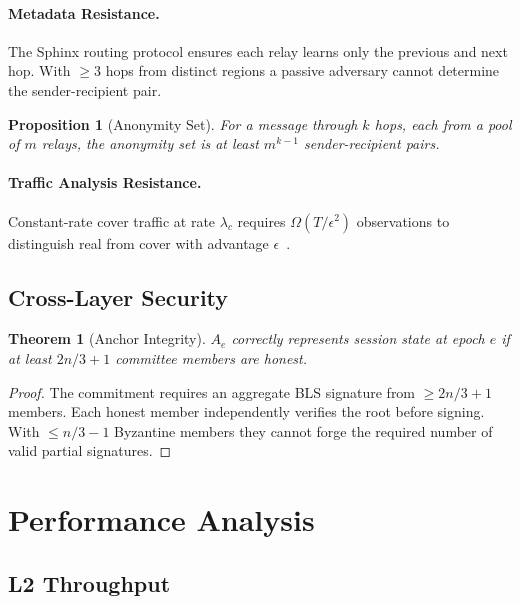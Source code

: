 \documentclass[11pt,a4paper]{article}
\newtheorem{theorem}{Theorem}[section]
\newtheorem{proposition}{Proposition}[section]
\begin{document}
\paragraph{Metadata Resistance.}
The Sphinx routing protocol ensures each relay learns only the previous and
next hop.  With $\geq 3$ hops from distinct regions a passive adversary
cannot determine the sender-recipient pair.

\begin{proposition}[Anonymity Set]
    For a message through $k$ hops, each from a pool of $m$ relays, the
    anonymity set is at least $m^{k-1}$ sender-recipient pairs.
\end{proposition}

\paragraph{Traffic Analysis Resistance.}
Constant-rate cover traffic at rate $\lambda_c$ requires
$\Omega(T / \epsilon^2)$ observations to distinguish real from cover with
advantage $\epsilon$~\cite{danezis2004statistical}.

\subsection{Cross-Layer Security}

\begin{theorem}[Anchor Integrity]
    $A_e$ correctly represents session state at epoch $e$ if at least
    $2n/3 + 1$ committee members are honest.
\end{theorem}

\begin{proof}
    The commitment requires an aggregate BLS signature from
    $\geq 2n/3 + 1$ members.  Each honest member independently verifies
    the root before signing.  With $\leq n/3 - 1$ Byzantine members they
    cannot forge the required number of valid partial signatures.
\end{proof}

\section{Performance Analysis}
\label{sec:performance}

\subsection{L2 Throughput}
\end{document}
